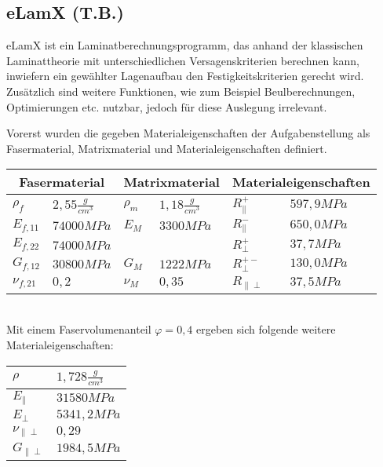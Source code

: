 
\subsection{eLamX (T.B.)}
eLamX ist ein Laminatberechnungsprogramm, das anhand der klassischen Laminattheorie mit unterschiedlichen Versagenskriterien berechnen kann, inwiefern ein gewählter Lagenaufbau den Festigkeitskriterien gerecht wird. Zusätzlich sind weitere Funktionen, wie zum Beispiel Beulberechnungen, Optimierungen etc. nutzbar, jedoch für diese Auslegung irrelevant.

\noindent Vorerst wurden die gegeben Materialeigenschaften der Aufgabenstellung als Fasermaterial, Matrixmaterial und  Materialeigenschaften definiert.\\

\begin{tabular}{ll|ll|ll}
	\multicolumn{2}{c}{Fasermaterial} &\multicolumn{2}{c}{Matrixmaterial}  &\multicolumn{2}{c}{Materialeigenschaften} \\
	\hline
	$\rho_{f}$ & $2,55 \frac{g}{cm^{3}}$  & $\rho_{m}$ & $1,18 \frac{g}{cm^{3}}$  & $R_{\parallel}^{+}$ & $597,9MPa$ \\
	\hline
	$E_{f,11}$ & $74000MPa$  & $E_{M}$ & $3300MPa$  & $R_{\parallel}^{-}$ & $650,0MPa$\\
	\hline
	$E_{f,22}$ & $74000MPa$  &  &   & $R_{\perp}^{+}$ & $37,7MPa$\\
	\hline
	$G_{f,12}$ & $30800MPa$ & $G_{M}$ & $1222MPa$ & $R_{\perp}^{+-}$ & $130,0MPa$\\
	\hline
	$\nu_{f,21}$ & $0,2$  &$\nu_{M}$ &  $0,35$  & $R_{\parallel\perp}$ & $37,5MPa$\\
\end{tabular}\\

\noindent Mit einem Faservolumenanteil $\varphi=0,4$ ergeben sich folgende weitere Materialeigenschaften:\\

\begin{tabular}{ll}
	$\rho$ & $1,728 \frac{g}{cm^{3}}$ \\
	\hline
	$E_{\parallel}$ & $31580 MPa$\\
	\hline
	$E_{\perp}$ & $5341,2MPa$\\
	\hline
	$\nu_{\parallel\perp}$ & $0,29$\\
	\hline
	$G_{\parallel\perp}$ & $1984,5 MPa$\\
\end{tabular}\\

